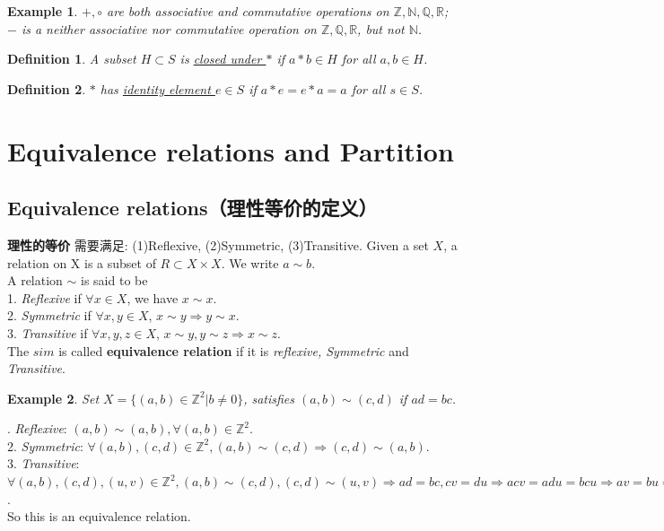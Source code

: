 \documentclass[11pt,a4paper]{article}
\newtheorem{example}{Example}
\newtheorem{definition}{Definition}
\begin{document}
\begin{example}

${+,\circ}$ are both \textit{associative} and \textit{commutative} operations on $\mathbb{Z},\mathbb{N},\mathbb{Q},\mathbb{R}$; $-$ is a neither \textit{associative} nor \textit{commutative} operation on $\mathbb{Z},\mathbb{Q},\mathbb{R}$, but not $\mathbb{N}$.
\end{example}

\begin{definition}
A subset $H\subset S$ is \underline{closed under $*$} if $a*b\in H$ for all $a,b\in H$.
\end{definition}

\begin{definition}
$*$ has \underline{identity element $e\in S$} if $a*e=e*a=a$ for all $s\in S$.
\end{definition}









\section{Equivalence relations and Partition}
\subsection{Equivalence relations（理性等价的定义）}
\textbf{理性的等价} 需要满足: (1)Reflexive, (2)Symmetric, (3)Transitive.
Given a set $X$, a relation on X is a subset of $R\subset X\times X$. We write $a\sim b$.\\
A relation $\sim$ is said to be\\
1. \textit{Reflexive} if $\forall x\in X$, we have $x\sim x$.\\
2. \textit{Symmetric} if $\forall x,y\in X$, $x\sim y\Rightarrow y\sim x$.\\
3. \textit{Transitive} if $\forall x,y,z\in X$, $x\sim y, y\sim z\Rightarrow x\sim z$.\\
The $sim$ is called \textbf{equivalence relation} if it is \textit{reflexive, Symmetric} and \textit{Transitive}.

\begin{example}
    Set $X=\{(a,b)\in \mathbb{Z}^2|b\neq 0 \}$, satisfies $(a,b)\sim(c,d)$ if $ad=bc$.
\end{example}
. \textit{Reflexive}: $(a,b)\sim(a,b), \forall (a,b)\in \mathbb{Z}^2$.\\
2. \textit{Symmetric}: $\forall (a,b),(c,d)\in \mathbb{Z}^2 ,(a,b)\sim(c,d)\Rightarrow (c,d)\sim(a,b)$.\\
3. \textit{Transitive}: $\forall (a,b),(c,d),(u,v)\in \mathbb{Z}^2 ,(a,b)\sim(c,d), (c,d)\sim(u,v)\Rightarrow ad=bc, cv=du \Rightarrow acv=adu=bcu\Rightarrow av=bu\Rightarrow (a,b)\sim(u,v)$.\\
So this is an equivalence relation.
\end{document}
